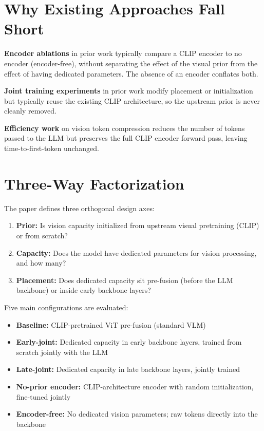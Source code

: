 \documentclass[10pt,twocolumn]{article}
\begin{document}
\section{Why Existing Approaches Fall Short}

\textbf{Encoder ablations} in prior work typically compare a CLIP encoder to no encoder (encoder-free), without separating the effect of the visual prior from the effect of having dedicated parameters.
The absence of an encoder conflates both.

\textbf{Joint training experiments} in prior work modify placement or initialization but typically reuse the existing CLIP architecture, so the upstream prior is never cleanly removed.

\textbf{Efficiency work} on vision token compression reduces the number of tokens passed to the LLM but preserves the full CLIP encoder forward pass, leaving time-to-first-token unchanged.

\section{Three-Way Factorization}

The paper defines three orthogonal design axes:
\begin{enumerate}[leftmargin=1.5em,itemsep=1pt]
  \item \textbf{Prior:} Is vision capacity initialized from upstream visual pretraining (CLIP) or from scratch?
  \item \textbf{Capacity:} Does the model have dedicated parameters for vision processing, and how many?
  \item \textbf{Placement:} Does dedicated capacity sit pre-fusion (before the LLM backbone) or inside early backbone layers?
\end{enumerate}

Five main configurations are evaluated:
\begin{itemize}[leftmargin=1em,itemsep=1pt,parsep=0pt]
  \item \textbf{Baseline:} CLIP-pretrained ViT pre-fusion (standard VLM)
  \item \textbf{Early-joint:} Dedicated capacity in early backbone layers, trained from scratch jointly with the LLM
  \item \textbf{Late-joint:} Dedicated capacity in late backbone layers, jointly trained
  \item \textbf{No-prior encoder:} CLIP-architecture encoder with random initialization, fine-tuned jointly
  \item \textbf{Encoder-free:} No dedicated vision parameters; raw tokens directly into the backbone
\end{itemize}
\end{document}

